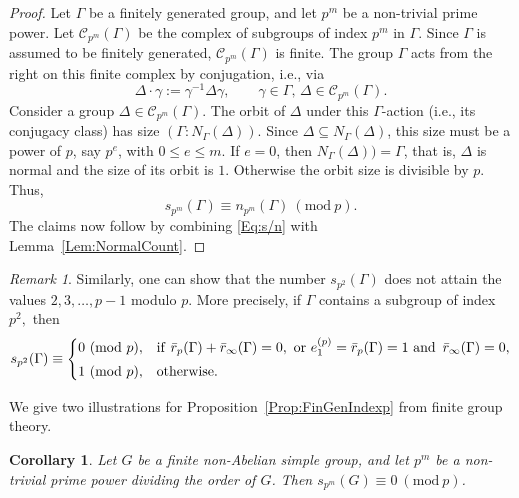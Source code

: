 \documentclass[12pt,reqno]{amsart}
\numberwithin{equation}{section}
\newtheorem{corollary}[theorem]{Corollary}
\theoremstyle{remark}
\newtheorem*{remark}{Remark}
\begin{document}
\begin{proof}
Let $\Gamma$ be a finitely generated group, and let $p^m$ be a
  non-trivial prime power. Let $\mathcal{C}_{p^m}(\Gamma)$ be the
  complex of subgroups of index $p^m$ in $\Gamma$. Since $\Gamma$ is
  assumed to be finitely generated, $\mathcal{C}_{p^m}(\Gamma)$ is
  finite. The group $\Gamma$ acts from the right
  on this finite complex  by conjugation, i.e., via 
\[
\Delta\cdot \gamma := \gamma^{-1} \Delta
\gamma,\qquad\gamma\in\Gamma,\, \Delta\in \mathcal{C}_{p^m}(\Gamma). 
\] 
Consider a group
$\Delta\in\mathcal{C}_{p^m}(\Gamma)$. The orbit of $\Delta$ under this
$\Gamma$-action (i.e., its conjugacy class) has size $(\Gamma:
N_\Gamma(\Delta))$. Since $\Delta\subseteq N_\Gamma(\Delta)$,
this size must be a power of $p$, say $p^e$, with $0\le e\le m$. 
If $e=0$, then $N_\Gamma(\Delta))=\Gamma$,
that is, $\Delta$ is normal and the size of its orbit is $1$. 
Otherwise the orbit size is divisible
by $p$. Thus,
\begin{equation} 
\label{Eq:s/n}
s_{p^m}(\Gamma) \equiv n_{p^m}(\Gamma)~(\mathrm{mod}~p).
\end{equation}
The claims now follow by combining \eqref{Eq:s/n} with 
Lemma~\ref{Lem:NormalCount}. 
\end{proof}

\begin{remark}
Similarly, one can show that
the number $s_{p^2}(\Gamma)$ does not attain the values
  $2, 3, \ldots, p-1$ modulo $p$. More precisely, if\/ $\Gamma$ contains
  a subgroup of index $p^2,$ then 
\begin{equation}
\label{Eq:FinGenIndp^2Cong}
s_{p^2}(\Gamma) \equiv \begin{cases} 0~(\mathrm{mod}~p),& 
\text{if\/ }\bar{r}_p(\Gamma) +
  \bar{r}_\infty(\Gamma)=0, \mbox{ or }e_1^{(p)} = \bar{r}_p(\Gamma) =
  1 \mbox{ and } \, \bar{r}_\infty(\Gamma)=0,\\[1mm] 
1~(\mathrm{mod}~p),& 
\mbox{otherwise.} \end{cases}
\end{equation}
\end{remark}

We give two illustrations for Proposition~\ref{Prop:FinGenIndexp} 
from finite group theory.

\begin{corollary} \label{cor:pm1}
Let\/ $G$ be a finite non-Abelian simple group, and let $p^m$ be a
non-trivial prime power dividing the order of\/ $G$. Then $s_{p^m}(G)
\equiv 0~(\mathrm{mod}~p)$. 
\end{corollary}
\end{document}
